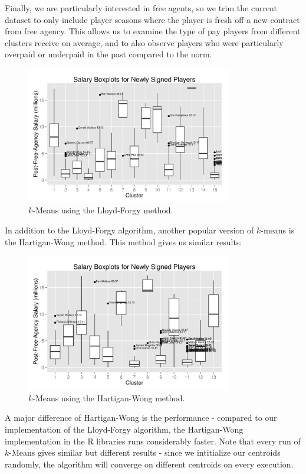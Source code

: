 \documentclass{article}
\begin{document}
Finally, we are particularly interested in free agents, so we trim the current dataset to only include player seasons where the player is fresh off a new contract from free agency. This allows us to examine the type of pay players from different clusters receive on average, and to also observe players who were particularly overpaid or underpaid in the past compared to the norm.

\begin{figure}[h!]
    \centering
    \includegraphics[width=0.8\textwidth]{lf-kmeans.jpeg}
    \caption{$k$-Means using the Lloyd-Forgy method.}
\end{figure}

In addition to the Lloyd-Forgy algorithm, another popular version of $k$-means is the Hartigan-Wong method. This method gives us similar results:

\begin{figure}[h!]
    \centering
    \includegraphics[width=0.8\textwidth]{hw-kmeans.jpeg}
    \caption{$k$-Means using the Hartigan-Wong method.}
\end{figure}

A major difference of Hartigan-Wong is the performance - compared to our implementation of the Lloyd-Forgy algorithm, the Hartigan-Wong implementation in the R libraries runs considerably faster. Note that every run of $k$-Means gives similar but different results - since we intitialize our centroids randomly, the algorithm will converge on different centroids on every execution.
\end{document}
